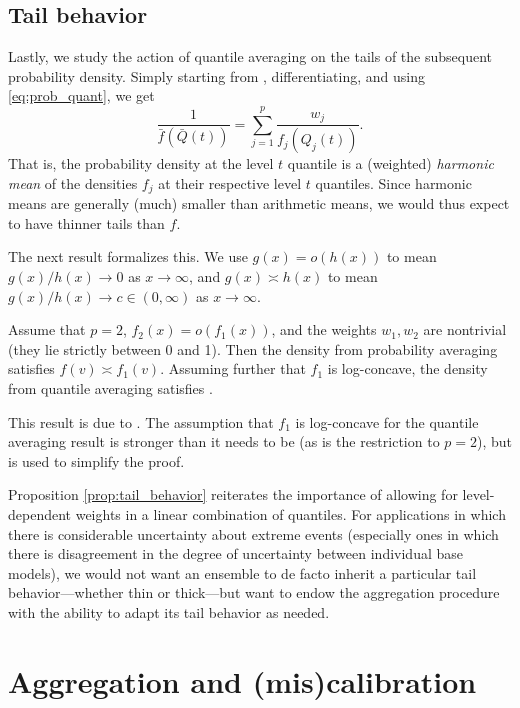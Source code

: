 \documentclass{article}
\begin{document}
\subsection{Tail behavior}

Lastly, we study the action of quantile averaging on the tails of the subsequent
probability density. Simply starting from , differentiating, and using \eqref{eq:prob_quant}, we get
\[
\frac{1}{\bar{f}(\bar{Q}(t))} = \sum_{j=1}^p \frac{w_j}{f_j(Q_j(t))}. 
\]
That is, the probability density  at the level $t$ quantile is
a (weighted) \emph{harmonic mean} of the densities $f_j$ at their respective
level $t$ quantiles. Since harmonic means are generally (much) smaller than
arithmetic means, we would thus expect  to have thinner tails
than $f$. 

The next result formalizes this. We use $g(x) = o(h(x))$ to mean $g(x)/h(x) \to
0$ as $x \to \infty$, and $g(x) \asymp h(x)$ to mean $g(x)/h(x) \to c \in (0,
\infty)$ as $x \to \infty$. 

\begin{proposition}
\label{prop:tail_behavior}
Assume that $p=2$, $f_2(x) = o(f_1(x))$, and the weights $w_1,w_2$ are
nontrivial (they lie strictly between 0 and 1). Then the density from
probability averaging satisfies $f(v) \asymp f_1(v)$. Assuming further that
$f_1$ is log-concave, the density from quantile averaging satisfies
.  
\end{proposition}

This result is due to \citet{fakoor2021flexible}. The assumption that $f_1$ is
log-concave for the quantile averaging result is stronger than it needs to be
(as is the restriction to $p=2$), but is used to simplify the proof. 

Proposition \ref{prop:tail_behavior} reiterates the importance of allowing for
level-dependent weights in a linear combination of quantiles. For applications
in which there is considerable uncertainty about extreme events (especially ones
in which there is disagreement in the degree of uncertainty between individual
base models), we would not want an ensemble to de facto inherit a particular
tail behavior---whether thin or thick---but want to endow the aggregation
procedure with the ability to adapt its tail behavior as needed.

\section{Aggregation and (mis)calibration}
\label{sec:aggr_calib}
\end{document}

